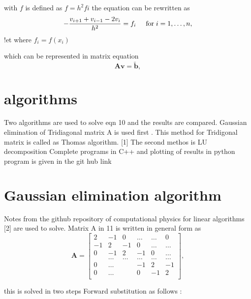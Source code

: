\documentclass{article}
\begin{document}
with $f$ is defined as $f = h^2 fi$
the equation can be rewritten as 
\begin{equation}
   -\frac{v_{i+1}+v_{i-1}-2v_i}{h^2} = f_i  \hspace{0.5cm} \mathrm{for} \hspace{0.1cm} i=1,\dots, n,
\end{equation}
!et
where $f_i=f(x_i)$

which can be represented in matrix equation 
\begin{equation}
   \mathbf{A}\mathbf{v} = \tilde{\mathbf{b}},
\end{equation}




\section{ algorithms}
Two algorithms are used to solve eqn 10 and the results are compared.
Gaussian elimination of Tridiagonal matrix A is used first . This method for Tridigonal matrix is called as Thomas algorithm. [1]
The second methos is LU decomposition
Complete programs in C++ and plotting of results in python program is given in the git hub link 
\section{ Gaussian elimination algorithm}
Notes from the github repository of computational physics for linear algorithms [2] are used to solve.
Matrix A in 11 is written in general form as
\[
    \mathbf{A} = \begin{bmatrix}
                           2& -1& 0 &\dots   & \dots &0 \\
                           -1 & 2 & -1 &0 &\dots &\dots \\
                           0&-1 &2 & -1 & 0 & \dots \\
                           & \dots   & \dots &\dots   &\dots & \dots \\
                           0&\dots   &  &-1 &2& -1 \\
                           0&\dots    &  & 0  &-1 & 2 \\
                      \end{bmatrix},
\]

this is solved in two steps 
Forward substitution as follows :
\end{document}
